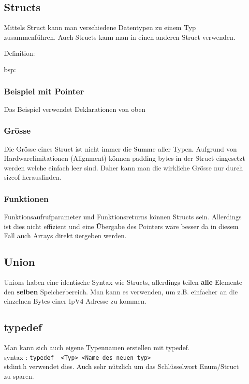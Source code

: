 \subsection{Structs}

Mittels Struct kann man verschiedene Datentypen zu einem Typ zusammenführen. Auch Structs kann man in einen anderen Struct verwenden.\\

\noindent
\begin{minipage}{0.5\columnwidth}
Definition:

\end{minipage}
\begin{minipage}{0.5\columnwidth}
bsp:

\end{minipage}

\subsubsection{Beispiel mit Pointer}

Das Beispiel verwendet Deklarationen von oben


\subsubsection{Grösse}

Die Grösse eines Struct ist nicht immer die Summe aller Typen. Aufgrund von Hardwarelimitationen (Alignment) können padding bytes in der Struct eingesetzt werden welche einfach leer sind. Daher kann man die wirkliche Grösse nur durch sizeof herausfinden.

\subsubsection{Funktionen}

Funktionsaufrufparameter und Funktionsreturns können Structs sein. Allerdings ist dies nicht effizient und eine Übergabe des Pointers wäre besser da in diesem Fall auch Arrays direkt üergeben werden.

\subsection{Union}

Unions haben eine identische Syntax wie Structs, allerdings teilen \textbf{alle} Elemente den \textbf{selben} Speicherbereich. Man kann es verwenden, um z.B. einfacher an die einzelnen Bytes einer IpV4 Adresse zu kommen.



\subsection{typedef}

Man kann sich auch eigene Typennamen erstellen mit typedef.\\
syntax : \verb|typedef  <Typ> <Name des neuen typ>|\\
stdint.h verwendet dies. 
Auch sehr nützlich um das Schlüsselwort Enum/Struct zu sparen. 
